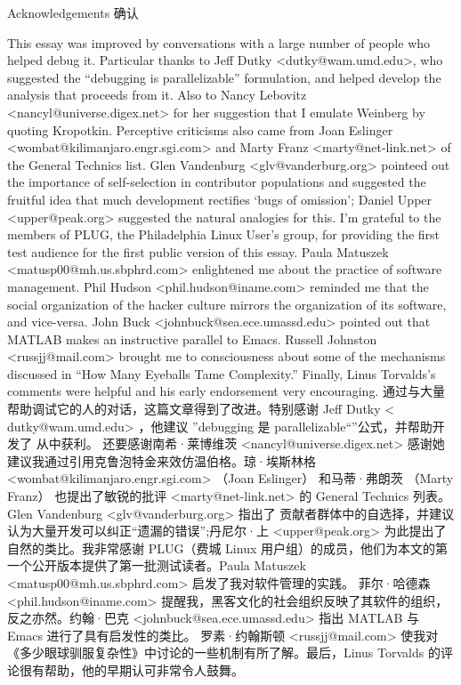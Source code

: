 \documentclass[a4paper,12pt,UTF8,twoside]{ctexbook}
\begin{document}
Acknowledgements  确认

This essay was improved by conversations with a large number of people who helped debug it. Particular thanks to Jeff Dutky <dutky@wam.umd.edu>, who suggested the ``debugging is parallelizable'' formulation, and helped develop the analysis that proceeds from it. Also to Nancy Lebovitz <nancyl@universe.digex.net> for her suggestion that I emulate Weinberg by quoting Kropotkin. Perceptive criticisms also came from Joan Eslinger <wombat@kilimanjaro.engr.sgi.com> and Marty Franz <marty@net-link.net> of the General Technics list. Glen Vandenburg <glv@vanderburg.org> pointeed out the importance of self-selection in contributor populations and suggested the fruitful idea that much development rectifies `bugs of omission'; Daniel Upper <upper@peak.org> suggested the natural analogies for this. I'm grateful to the members of PLUG, the Philadelphia Linux User's group, for providing the first test audience for the first public version of this essay. Paula Matuszek <matusp00@mh.us.sbphrd.com> enlightened me about the practice of software management. Phil Hudson <phil.hudson@iname.com> reminded me that the social organization of the hacker culture mirrors the organization of its software, and vice-versa. John Buck <johnbuck@sea.ece.umassd.edu> pointed out that MATLAB makes an instructive parallel to Emacs. Russell Johnston <russjj@mail.com> brought me to consciousness about some of the mechanisms discussed in ``How Many Eyeballs Tame Complexity.'' Finally, Linus Torvalds's comments were helpful and his early endorsement very encouraging.
通过与大量帮助调试它的人的对话，这篇文章得到了改进。特别感谢 Jeff Dutky < dutky@wam.umd.edu> ，他建议 ''debugging 是 parallelizable“”公式，并帮助开发了 从中获利。 还要感谢南希·莱博维茨 <nancyl@universe.digex.net> 感谢她建议我通过引用克鲁泡特金来效仿温伯格。琼·埃斯林格 <wombat@kilimanjaro.engr.sgi.com> （Joan Eslinger） 和马蒂·弗朗茨 （Marty Franz） 也提出了敏锐的批评 <marty@net-link.net> 的 General Technics 列表。Glen Vandenburg <glv@vanderburg.org> 指出了 贡献者群体中的自选择，并建议 认为大量开发可以纠正“遗漏的错误”;丹尼尔·上 <upper@peak.org> 为此提出了自然的类比。我非常感谢 PLUG（费城 Linux 用户组）的成员，他们为本文的第一个公开版本提供了第一批测试读者。Paula Matuszek <matusp00@mh.us.sbphrd.com> 启发了我对软件管理的实践。 菲尔·哈德森 <phil.hudson@iname.com> 提醒我，黑客文化的社会组织反映了其软件的组织，反之亦然。约翰·巴克 <johnbuck@sea.ece.umassd.edu> 指出 MATLAB 与 Emacs 进行了具有启发性的类比。 罗素·约翰斯顿 <russjj@mail.com> 使我对《多少眼球驯服复杂性》中讨论的一些机制有所了解。最后，Linus Torvalds 的评论很有帮助，他的早期认可非常令人鼓舞。
\end{document}
